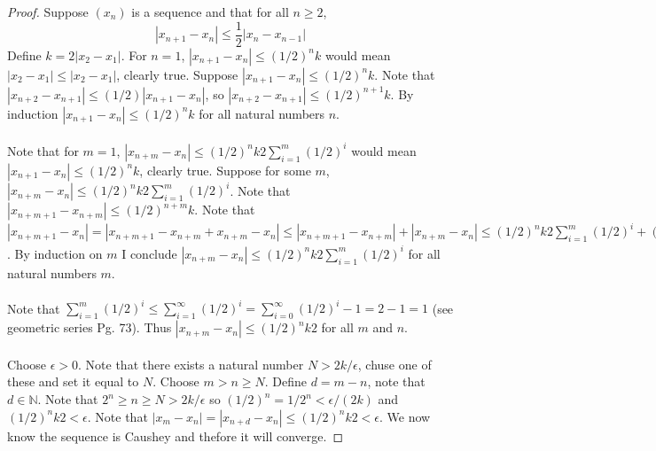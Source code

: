 \documentclass[12pt]{article}
\theoremstyle{homework}
\begin{document}
\begin{proof}
Suppose $(x_n)$ is a sequence and that for all $n \geq 2$,
$$|x_{n+1} - x_n| \leq\frac{1}{2}|x_n - x_{n-1}|$$
Define $k=2|x_2-x_1|$.  For $n=1$, $|x_{n+1} - x_n|\leq (1/2)^nk$ would mean $|x_2-x_1|\leq |x_2-x_1|$, clearly true.  Suppose $|x_{n+1} - x_n|\leq (1/2)^nk$.  Note that $|x_{n+2} - x_{n+1}| \leq(1/2)|x_{n+1} - x_{n}|$, so $|x_{n+2} - x_{n+1}|\leq (1/2)^{n+1}k$.  By induction $|x_{n+1} - x_n|\leq (1/2)^nk$ for all natural numbers $n$.\\\\
Note that for $m=1$, $|x_{n+m} - x_n|\leq (1/2)^nk2\sum_{i=1}^m(1/2)^i$ would mean $|x_{n+1} - x_n|\leq (1/2)^nk$, clearly true.  Suppose for some $m$, $|x_{n+m} - x_n|\leq (1/2)^nk2\sum_{i=1}^m(1/2)^i$.  Note that $|x_{n+m+1} - x_{n+m}|\leq (1/2)^{n+m}k$.  Note that $|x_{n+m+1} - x_n|=|x_{n+m+1} - x_{n+m}+x_{n+m} - x_n|\leq|x_{n+m+1} - x_{n+m}|+|x_{n+m} - x_n| \leq (1/2)^nk2\sum_{i=1}^m(1/2)^i+(1/2)^{n+m}k=(1/2)^nk2(\sum_{i=1}^m(1/2)^i+(1/2)^{m+1})=(1/2)^nk2\sum_{i=1}^{m+1}(1/2)^i$.  By induction on $m$ I conclude $|x_{n+m} - x_n|\leq (1/2)^nk2\sum_{i=1}^m(1/2)^i$ for all natural numbers $m$.\\\\
Note that $\sum_{i=1}^m(1/2)^i\leq \sum_{i=1}^{\infty}(1/2)^i=\sum_{i=0}^{\infty}(1/2)^i-1=2-1=1$ (see geometric series Pg. 73).  Thus $|x_{n+m} - x_n|\leq (1/2)^nk2$ for all $m$ and $n$.\\\\
Choose $\epsilon>0$.  Note that there exists a natural number $N>2k/\epsilon$, chuse one of these and set it equal to $N$.  Choose $m>n\geq N$.  Define $d=m-n$, note that $d\in\mathbb{N}$.  Note that $2^n\geq n\geq N>2k/\epsilon$ so $(1/2)^n=1/2^n<\epsilon/(2k)$ and $(1/2)^nk2<\epsilon$.  Note that $|x_m - x_n|=|x_{n+d} - x_n|\leq (1/2)^nk2<\epsilon$.  We now know the sequence is Caushey and thefore it will converge.
\end{proof}
\end{document}
